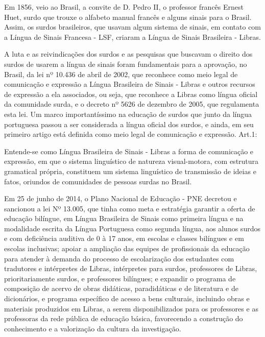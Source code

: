 \documentclass[brasil]{abnt}
\begin{document}
		Em 1856, veio ao Brasil, a convite de D. Pedro II, o professor francês Ernest Huet, surdo que trouxe o alfabeto manual francês e alguns sinais para o Brasil. Assim, os surdos brasileiros, que 
		usavam algum sistema de sinais, em contato com a Língua de Sinais Francesa - LSF, criaram a Língua de Sinais Brasileira - Libras. 
		
		A luta e as reivindicações dos surdos e as pesquisas que buscavam o direito dos surdos de usarem a língua de sinais foram fundamentais para a aprovação, no Brasil, da lei nº 10.436 de abril de 2002,
		que reconhece como meio legal de comunicação e expressão a Língua Brasileira de Sinais - Libras e outros recursos de expressão a ela associados, ou seja, que reconhece a Libras como língua oficial 
		da comunidade surda, e o decreto nº 5626 de dezembro de 2005, que regulamenta esta lei. Um marco importantíssimo na educação de surdos que junto da língua portuguesa passou a ser considerada a 
		língua oficial dos surdos, e ainda, em seu primeiro artigo está definida como meio legal de comunicação e expressão. Art.1:
			
				\begin{citacao} Entende-se como Língua Brasileira de Sinais - Libras a forma de comunicação e expressão, em que o sistema linguístico de natureza visual-motora, com estrutura gramatical própria, constituem
								um sistema linguístico de transmissão de ideias e fatos, oriundos de comunidades de pessoas surdas no Brasil.
				\end{citacao}
				
		Em 25 de junho de 2014, o Plano Nacional de Educação - PNE decretou e sancionou a lei Nº 13.005, que tinha como meta e estratégia garantir a oferta de educação bilíngue, em Língua Brasileira de Sinais 
		como primeira língua e na modalidade escrita da Língua Portuguesa como segunda língua, aos alunos surdos e com deficiência auditiva de 0 à 17 anos, em escolas e classes bilíngues e em escolas 
		inclusivas; apoiar a ampliação das equipes de profissionais da educação para atender à demanda do processo de escolarização dos estudantes com tradutores e intérpretes de Libras, intérpretes para surdos, 
		professores de Libras, prioritariamente surdos, e professores bilíngues; e expandir o programa de composição de acervo de obras didáticas, paradidáticas e de literatura e de dicionários, e programa 
		específico de acesso a bens culturais, incluindo obras e materiais produzidos em Libras, a serem disponibilizados para os professores e as professoras da rede pública de educação básica, favorecendo a 
		construção do conhecimento e a valorização da cultura da investigação.
				
\end{document}

